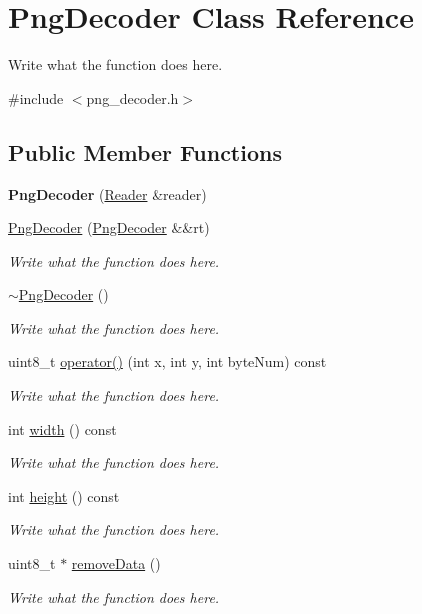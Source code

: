 \hypertarget{classPngDecoder}{\section{Png\+Decoder Class Reference}
\label{classPngDecoder}
}


Write what the function does here.  




{\ttfamily \#include $<$png\+\_\+decoder.\+h$>$}

\subsection*{Public Member Functions}
\begin{DoxyCompactItemize}
\item 
\hypertarget{classPngDecoder_ad2a3600a772e46d9957240cb13909b9a}{{\bfseries Png\+Decoder} (\hyperlink{classReader}{Reader} \&reader)}\label{classPngDecoder_ad2a3600a772e46d9957240cb13909b9a}

\item 
\hyperlink{classPngDecoder_abb583c6067fbcd11133ee69041ff7839}{Png\+Decoder} (\hyperlink{classPngDecoder}{Png\+Decoder} \&\&rt)
\begin{DoxyCompactList}\small\item\em Write what the function does here. \end{DoxyCompactList}\item 
\hyperlink{classPngDecoder_ac029788d28a1551b584cf387f71bb127}{$\sim$\+Png\+Decoder} ()
\begin{DoxyCompactList}\small\item\em Write what the function does here. \end{DoxyCompactList}\item 
uint8\+\_\+t \hyperlink{classPngDecoder_ac8546a346caf8b6e80cc0713188109b5}{operator()} (int x, int y, int byte\+Num) const 
\begin{DoxyCompactList}\small\item\em Write what the function does here. \end{DoxyCompactList}\item 
int \hyperlink{classPngDecoder_a0a42c8992ee9e3ac8ec5565f5a0094e8}{width} () const 
\begin{DoxyCompactList}\small\item\em Write what the function does here. \end{DoxyCompactList}\item 
int \hyperlink{classPngDecoder_aeb76e6f9eda9439b913ff9a7f43d4393}{height} () const 
\begin{DoxyCompactList}\small\item\em Write what the function does here. \end{DoxyCompactList}\item 
uint8\+\_\+t $\ast$ \hyperlink{classPngDecoder_ab8c9261a551941015ea4721d6972ec30}{remove\+Data} ()
\begin{DoxyCompactList}\small\item\em Write what the function does here. \end{DoxyCompactList}\end{DoxyCompactItemize}
